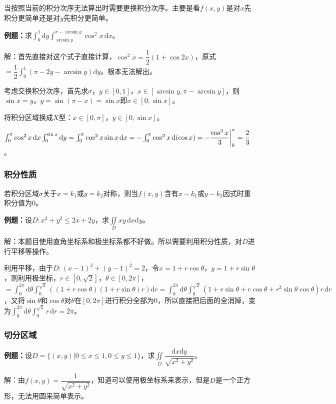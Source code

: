 \documentclass[UTF8, 12pt]{ctexart}
\begin{document}
当按照当前的积分次序无法算出时需要更换积分次序。主要是看$f(x,y)$是对$x$先积分更简单还是对$y$先积分更简单。

\textbf{例题：}求$\int_0^1\textrm{d}y\int_{\arcsin y}^{\pi-\arcsin y}\cos^2x\,\textrm{d}x$。

解：首先直接对这个式子直接计算，$\cos^2x=\dfrac{1}{2}(1+\cos2x)$，原式$=\dfrac{1}{2}\int_0^1(\pi-2y-\arcsin y)\textrm{d}y$。根本无法解出。

考虑交换积分次序，首先求$\sigma$，$y\in[0,1]$，$x\in[\arcsin y,\pi-\arcsin y]$，则$\sin x=y$，$y=\sin(\pi-x)=\sin x$即$x\in[0,\sin x]$。

将积分区域换成$X$型：$x\in[0,\pi]$，$y\in[0,\sin x]$。

$\int_0^\pi\cos^2x\,\textrm{d}x\int_0^{\sin x}\textrm{d}y=\int_0^\pi\cos^2x\sin x\,\textrm{d}x=-\int_0^\pi\cos^2x\,\textrm{d}(\cos x)=-\dfrac{\cos^3x}{3}\bigg|_0^\pi\\=\dfrac{2}{3}$。

\subsubsection{积分性质}

若积分区域$\sigma$关于$x=k_1$或$y=k_2$对称，则当$f(x,y)$含有$x-k_1$或$y-k_2$因式时重积分值为0。

\textbf{例题：}设$D:x^2+y^2\leqslant2x+2y$，求$\iint\limits_Dxy\,\textrm{d}x\textrm{d}y$。

解：本题目使用直角坐标系和极坐标系都不好做。所以需要利用积分性质，对$D$进行平移等操作。

利用平移，由于$D:(x-1)^2+(y-1)^2=2$，令$x=1+r\cos\theta$，$y=1+r\sin\theta$，则利用极坐标，$r\in[0,\sqrt{2}]$，$\theta\in[0,2\pi]$，$=\int_0^{2\pi}\textrm{d}\theta\int_0^{\sqrt{2}}((1+r\cos\theta)(1+r\sin\theta)r)\textrm{d}r=\int_0^{2\pi}\textrm{d}\theta\int_0^{\sqrt{2}}(1+r\sin\theta+r\cos\theta+r^2\sin\theta\cos\theta)r\,\textrm{d}r$，又将$\sin\theta$和$\cos\theta$对$\theta$在$[0,2\pi]$进行积分全部为0，所以直接把后面的全消掉，变为$\int_0^{2\pi}\textrm{d}\theta\int_0^{\sqrt{2}}r\,\textrm{d}r=2\pi$。

\subsubsection{切分区域}

\textbf{例题：}设$D=\{(x,y)|0\leqslant x\leqslant1,0\leqslant y\leqslant1\}$，求$\displaystyle{\iint\limits_D\dfrac{\textrm{d}x\textrm{d}y}{\sqrt{x^2+y^2}}}$。

解：由$f(x,y)=\dfrac{1}{\sqrt{x^2+y^2}}$，知道可以使用极坐标系来表示，但是$D$是一个正方形，无法用圆来简单表示。
\end{document}
